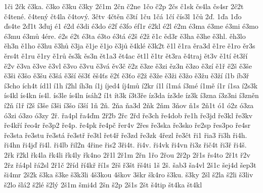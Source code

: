 {1\v ci
2\v ck
\v c3ka.
\v c3ko
\v c3ku
\v c3ky
2\v c1m
2\v cn
\v c2ne
1\v co
\v c2p
2\v cs
\v c1sk
\v cs4la
\v cs4sr
2\v c2t
\v c4ten\'e.
\v c4ten\'y
\v ct4la
\v c4tov\'y.
3\v ctv
4\v ct\v en
\v c3t\'i
1\v cu
1\v c\'a
1\v c\'i
\v c\'is3l
1\v c\r u
2\v d.
1\v da
1\v do
\v ds4te
2\v d1t
3\v duj
\'e1
\'e2d
\'e3di
\'e3do
\'e2f
\'e3fo
\'ef1r
\'e2kl
\'e2l
\'e2m
\'e3ma
\'e3me
\'e3mi
\'e3mo
\'e3mu
\'e3m\r u
4\'ere.
\'e2s
\'e2t
\'e3ta
\'e3to
\'e3t\'a
\'e2\v s
\'e2\v z
\v e1c
\v ed3r
\v e3ha
\v e3he
\v e3hl.
\v eh3lo
\v eh3n
\v e1ho
\v e3hu
\v e3h\r u
\v e3ja
\v e1je
\v e1jo
\v e3j\r u
\v e4kl\'e
\v e3k2t
\v e1l
\v e1ra
\v era3d
\v e1re
\v e1ro
\v er3s
\v ers4t
\v e1ru
\v e1ry
\v e1r\r u
\v es3k
\v es3n
\v et1a3
\v et4ac
\v et1l
\v e1tr
\v et3ra
\v e4traj
\v et3v
\v e1t\'i
\v et3\v r\'i
\v e2v
\v e3va
\v e3ve
\v e3vl
\v e3vo
\v e3vu
\v e3v\'a
\v ev3\v c
\v e2z
\v e3ze
\v e3zi
\v ez3n
\v e3zo
\v e3z\'i
\v e1\v r
\v e2\v s
\v e3\v se
\v e3\v si
\v e3\v so
\v e3\v su
\v e3\v s\'a
\v e3\v s\'i
\v e\v s3\v t
\v e\v s4\v ts
\v e2\v t
\v e3\v to
\v e2\v z
\v e3\v ze
\v e3\v zi
\v e3\v zo
\v e3\v zu
\v e3\v z\'i
\'i1b
\'ib3\v r
\'i3cho
\'ich4t
\'id1l
\'i1h
\'i2hl
\'ih3n
\'i1j
\'ijed4
\'ij4m\r u
\'i2kr
\'i1l
\'i1m\'a
\'i3m\'e
\'i1m\v e
\'i1r
\'i1sa
\'i2s3k
\'is4kl
\'is4kn
\'is4l.
\'is3le
\'is4ln
\'is\'ah2
\'i1t
\'it3k
\'i3t3\v re
\'iz3da
\'iz3de
\'iz3k
\'i3zna
\'i3z3ni
\'i3zn\v en
\'i2\v n
\'i1\v r
\'i2\v s
\'i3\v se
\'i3\v si
\'i3\v so
\'i3\v s\'i
1\v n
2\v n.
2\v na
\v na3d
2\v nk
2\v nm
3\v nov
\v n1s
2\v n1t
\'o1
\'o2z
\'o3za
\'o3zi
\'o3zo
\'o3zy
2\v r.
\v ra4pl
\v ra4\v dm
2\v r2b
2\v rc
2\v rd
\v re3ch
\v re4dob
\v re1h
\v re3jd
\v re3kl
\v re3kv
\v re4k\v r\'i
\v reo4r
\v re3p2
\v re4p.
\v re4pk
\v re4p\v c
\v rer4v
2\v res
\v re3ska
\v re3sko
\v re2sp
\v res3po
\v re4sr
\v re3sta
\v re3stu
\v re3st\'a
\v re3st\v r
\v re3tl
\v ret4\v r
\v re3zd
\v re3zk
4\v rezl
\v re3\v ct
\v ri1
\v ria3
\v ri3h
\v ri4h.
\v ri4hn
\v ri4j\v d
\v ri4l.
\v ri4lb
\v ril2n
4\v rine
\v ris2
3\v ri4t.
\v ri4v.
\v ri4vk
\v ri4vn
\v ri3z
\v ri\v c4t
\v ri3\v r
\v ri4\v s.
2\v rk
\v r2kl
\v rk4la
\v rk4li
\v rk4ly
\v rk4no
2\v r1l
2\v r1m
2\v rn
1\v ro
2\v rou
2\v r2p
2\v r1s
\v rs4to
2\v r1t
\v r2v
2\v rz
\v r\'a4pl
\v r\'a2sl
2\v r1\v c
2\v r\'id
\v r\'i4k\v r
\v r\'i1s
2\v r\v s
\v r3\v st
\v r\v s4ti
1\v s
2\v s.
\v sab3
\v sa4vl
2\v s1c
\v sej4d
\v sep3t
\v si4mr
2\v s2k
\v s3ka
\v s3ke
\v s3k3li
4\v s3kou
4\v skov
3\v skr
\v sk4ro
\v s3ku.
\v s3ky
2\v sl
\v s2la
\v s2li
\v s3liv
\v s2lo
\v sl\'a2
\v s2l\'e
\v s2l\'y
2\v s1m
\v smi4d
2\v sn
\v s2p
2\v s1s
2\v st
\v s4tip
\v st4ka
\v st4kl
}
